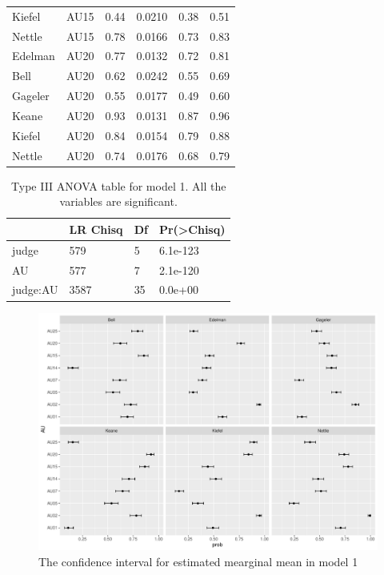 \documentclass{monashthesis}
\begin{document}
\begin{table}[ht]
\begin{center}
\begin{tabular}{llllll}
Kiefel & AU15 & 0.44 & 0.0210 & 0.38 & 0.51 \\
Nettle & AU15 & 0.78 & 0.0166 & 0.73 & 0.83 \\
Edelman & AU20 & 0.77 & 0.0132 & 0.72 & 0.81 \\
Bell & AU20 & 0.62 & 0.0242 & 0.55 & 0.69 \\
Gageler & AU20 & 0.55 & 0.0177 & 0.49 & 0.60 \\
Keane & AU20 & 0.93 & 0.0131 & 0.87 & 0.96 \\
Kiefel & AU20 & 0.84 & 0.0154 & 0.79 & 0.88 \\
Nettle & AU20 & 0.74 & 0.0176 & 0.68 & 0.79 \\
\bottomrule
\end{tabular}
\end{center}
\end{table}

\begin{table}

\caption{\label{tab:anova-1}\label{tab:anova-1}Type III ANOVA table for model 1. All the variables are significant.}
\centering
\begin{tabular}[t]{l|l|l|l}
\hline
  & LR Chisq & Df & Pr(>Chisq)\\
\hline
judge & 579 & 5 & 6.1e-123\\
\hline
AU & 577 & 7 & 2.1e-120\\
\hline
judge:AU & 3587 & 35 & 0.0e+00\\
\hline
\end{tabular}
\end{table}

\begin{figure}

{\centering \includegraphics[width=1\linewidth]{figures/model1-plot-1} 

}

\caption{The confidence interval for estimated mearginal mean in model 1}\label{fig:model1-plot}
\end{figure}
\end{document}

